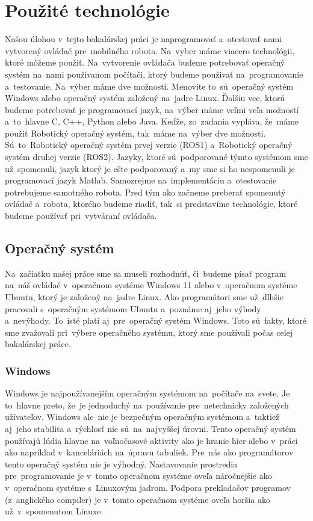\section{Použité technológie}
\label{sec:technologies}

Našou úlohou v~tejto bakalárskej práci je naprogramovať a~otestovať nami vytvorený ovládač pre~mobilného robota.
Na~vyber máme viacero technológii, ktoré môžeme použiť. Na~vytvorenie ovládača budeme potrebovať operačný systém
na~nami používanom počítači, ktorý budeme použivať na~programovanie a~testovanie. Na~výber máme dve možnosti.
Menovite to~sú~operačný systém Windows alebo operačný systém založený na~jadre Linux. Ďalšiu vec, ktorú budeme
potrebovať je programovací jazyk, na~výber máme veľmi veľa možností a~to~hlavne C, C++, Python alebo Java.
Keďže, zo~zadania vypláva, že~máme použiť Robotický operačný systém, tak~máme na~výber dve možnosti. Sú~to~Robotický
operačný systém prvej verzie (ROS1) a~Robotický operačný systém druhej verzie (ROS2). Jazyky, ktoré sú~podporované
týmto systémom sme už~spomenuli, jazyk ktorý je ešte podporovaný a~my sme si ho nespomenuli je programovací jazyk Matlab.
Samozrejme na~implementáciu a~otestovanie potrebujeme samotného robota. Pred tým ako začneme preberať spomenutý
ovládač a~robota, ktorého budeme riadiť, tak~si predstavíme technológie, ktoré budeme používať pri~vytváraní ovládača.

\subsection{Operačný systém}
\label{sec:operating_system}

Na~začiatku našej práce sme sa museli rozhodnúť, či~budeme písať program na~náš ovládač v~operačnom systéme Windows 11 alebo
v~operačnom systéme Ubuntu, ktorý je založený na~jadre Linux. Ako programátori sme už~dlhšie pracovali s~operačným systémom
Ubuntu a~poznáme aj~jeho výhody a~nevýhody. To~isté platí aj~pre~operačný systém Windows. Toto sú~fakty, ktoré sme zvažovali
pri~výbere operačného systému, ktorý sme používali počas celej bakalárskej práce.

\subsubsection{Windows}
\label{sec:windows}

Windows je najpoužívanejším operačným systémom na~počítače na~svete. Je to~hlavne preto, že~je jednoduchý na~používanie
pre~netechnicky založených užívateľov. Windows ale~nie je bezpečným operačným systémom a~taktiež aj~jeho stabilita a~rýchlosť
nie sú~na~najvyššej úrovni. Tento operačný systém používajú lúdia hlavne na~voľnočasové aktivity ako je hranie hier
alebo v~práci ako napríklad v~kanceláriách na~úpravu tabuliek. Pre~nás ako programátorov tento operačný systém nie je
výhodný. Nastavovanie prostredia pre~programovanie je v~tomto operačnom systéme oveľa náročnejšie ako v~operačnom systéme
s~Linuxovým jadrom. Podpora prekladačov programov (z~anglického compiler) je v~tomto operačnom systéme oveľa horšia
ako už~v~spomenutom Linuxe.

